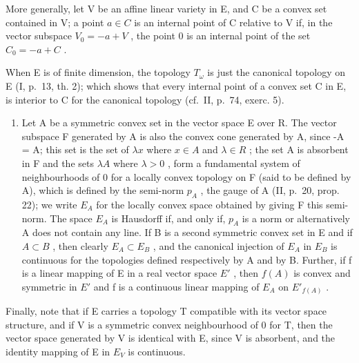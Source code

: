 More generally, let V be an affine linear variety in E, and C be a convex set contained in V; a point \(a \in C\) is an internal point of C relative to V if, in the vector subspace \(V_{0} = -a + V\) , the point 0 is an internal point of the set \(C_{0} = -a + C\) .

When E is of finite dimension, the topology \(T_{\omega}\) is just the canonical topology on E (I, p.~13, th. 2); which shows that every internal point of a convex set C in E, is interior to C for the canonical topology (cf.~II, p.~74, exerc. 5).

\begin{enumerate}
\def\labelenumi{\arabic{enumi})}
\setcounter{enumi}{2}
\tightlist
\item
  Let A be a symmetric convex set in the vector space E over R. The vector subspace F generated by A is also the convex cone generated by A, since -A = A; this set is the set of \(\lambda x\) where \(x \in A\) and \(\lambda \in R\) ; the set A is absorbent in F and the sets \(\lambda A\) where \(\lambda > 0\) , form a fundamental system of neighbourhoods of 0 for a locally convex topology on F (said to be defined by A), which is defined by the semi-norm \(p_{A}\) , the gauge of A (II, p.~20, prop. 22); we write \(E_{A}\) for the locally convex space obtained by giving F this semi-norm. The space \(E_{A}\) is Hausdorff if, and only if, \(p_{A}\) is a norm or alternatively A does not contain any line. If B is a second symmetric convex set in E and if \(A \subset B\) , then clearly \(E_{A} \subset E_{B}\) , and the canonical injection of \(E_{A}\) in \(E_{B}\) is continuous for the topologies defined respectively by A and by B. Further, if f is a linear mapping of E in a real vector space \(E'\) , then \(f(A)\) is convex and symmetric in \(E'\) and f is a continuous linear mapping of \(E_{A}\) on \(E'_{f(A)}\) .
\end{enumerate}

Finally, note that if E carries a topology T compatible with its vector space structure, and if V is a symmetric convex neighbourhood of 0 for T, then the vector space generated by V is identical with E, since V is absorbent, and the identity mapping of E in \(E_{V}\) is continuous.

